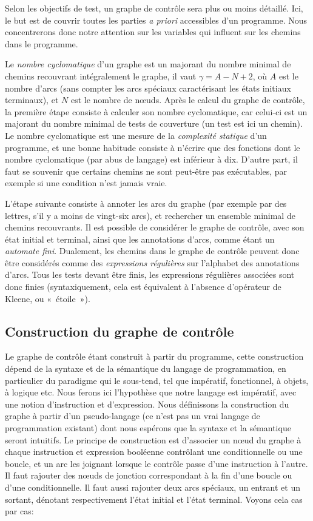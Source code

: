 \documentclass[11pt,a4paper]{article}
\begin{document}
Selon les objectifs de test, un graphe de contrôle sera plus ou moins
détaillé. Ici, le but est de couvrir toutes les parties \emph{a
priori} accessibles d'un programme. Nous concentrerons donc notre
attention sur les variables qui influent sur les chemins dans le
programme.

Le \emph{nombre cyclomatique} d'un graphe est un majorant du nombre
minimal de chemins recouvrant intégralement le graphe, il vaut $\gamma
= A - N + 2$, où $A$ est le nombre d'arcs (sans compter les arcs
spéciaux caractérisant les états initiaux terminaux), et $N$ est le
nombre de nœuds. Après le calcul du graphe de contrôle, la
première étape consiste à calculer son nombre cyclomatique, car
celui-ci est un majorant du nombre minimal de tests de couverture (un
test est ici un chemin). Le nombre cyclomatique est une mesure de la
\emph{complexité statique} d'un programme, et une bonne habitude
consiste à n'écrire que des fonctions dont le nombre cyclomatique (par
abus de langage) est inférieur à dix. D'autre part, il faut se
souvenir que certains chemins ne sont peut-être pas exécutables, par
exemple si une condition n'est jamais vraie.

L'étape suivante consiste à annoter les arcs du graphe (par exemple
par des lettres, s'il y a moins de vingt-six arcs), et rechercher un
ensemble minimal de chemins recouvrants. Il est possible de considérer
le graphe de contrôle, avec son état initial et terminal, ainsi que
les annotations d'arcs, comme étant un \emph{automate
fini}. Dualement, les chemins dans le graphe de contrôle peuvent donc
être considérés comme des \emph{expressions régulières} sur l'alphabet
des annotations d'arcs. Tous les tests devant être finis, les
expressions régulières associées sont donc finies (syntaxiquement,
cela est équivalent à l'absence d'opérateur de Kleene, ou «~étoile~»).

\subsection{Construction du graphe de contrôle}

Le graphe de contrôle étant construit à partir du programme, cette
construction dépend de la syntaxe et de la sémantique du langage de
programmation, en particulier du paradigme qui le sous-tend, tel que
impératif, fonctionnel, à objets, à logique etc. Nous ferons ici
l'hypothèse que notre langage est impératif, avec une notion
d'instruction et d'expression. Nous définissons la construction du
graphe à partir d'un pseudo-langage (ce n'est pas un vrai langage de
programmation existant) dont nous espérons que la syntaxe et la
sémantique seront intuitifs. Le principe de construction est
d'associer un nœud du graphe à chaque instruction et expression
booléenne contrôlant une conditionnelle ou une boucle, et un arc les
joignant lorsque le contrôle passe d'une instruction à l'autre. Il
faut rajouter des nœuds de jonction correspondant à la fin d'une
boucle ou d'une conditionnelle. Il faut aussi rajouter deux arcs
spéciaux, un entrant et un sortant, dénotant respectivement l'état
initial et l'état terminal. Voyons cela cas par cas:
\end{document}
